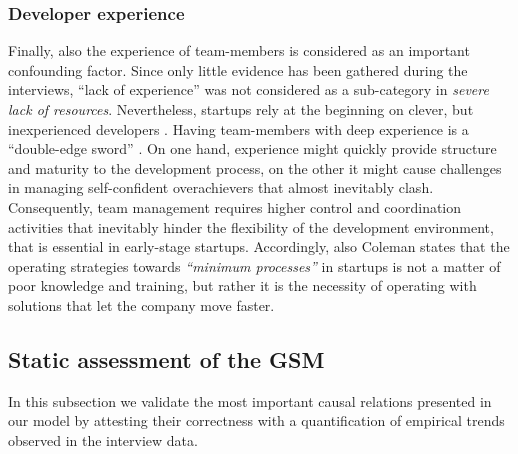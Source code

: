 \documentclass[10pt,journal,letterpaper,compsoc]{IEEEtran}
\begin{document}
\subsubsection{Developer experience}  
Finally, also the experience of team-members is considered as an important  
confounding factor. Since only little evidence has been gathered during the  
interviews, ``lack of experience'' was not considered as a sub-category in  
\textit{severe lack of resources}.
Nevertheless, startups rely at the beginning  on clever, but inexperienced
developers \cite{Crowne2002}. Having team-members  with deep experience is a
``double-edge sword'' \cite{Yoffie1999}. On one hand,  experience might quickly
provide structure and maturity to the development  process, on the other it
might cause challenges in managing self-confident  overachievers that almost
inevitably clash. Consequently, team management  requires higher control and
coordination activities that inevitably hinder the  flexibility of the
development environment, that is essential in early-stage  startups.
Accordingly, also Coleman \cite{Coleman2007, Coleman2008a,Coleman2008} states
that the operating strategies towards  \textit{``minimum processes''} in
startups is not a matter of poor knowledge and  training, but rather it is the
necessity of operating with solutions that let  the company move faster.


\subsection{Static assessment of the GSM} \label{sect:theory:validation:stats}

In this subsection we validate the most important causal relations presented in 
our model by attesting their correctness  with a quantification of empirical  
trends observed in the interview data.  
\end{document}
